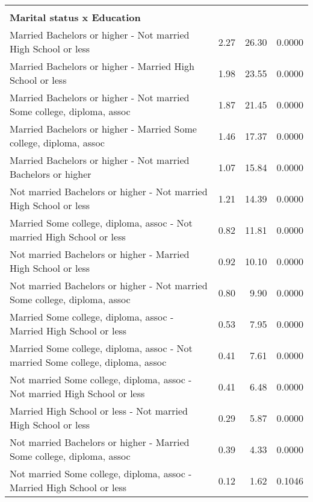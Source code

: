 \begin{center}
\begin{longtable}{lrrr}
{\bf{  }} & & & \\
{\bf{Marital status x Education}} & & & \\
\hline
    Married Bachelors or higher -  Not married High School or less & 2.27 & 26.30 & 0.0000 \\ 
    Married Bachelors or higher -  Married High School or less & 1.98 & 23.55 & 0.0000 \\ 
    Married Bachelors or higher -  Not married Some college, diploma, assoc & 1.87 & 21.45 & 0.0000 \\ 
    Married Bachelors or higher -  Married Some college, diploma, assoc & 1.46 & 17.37 & 0.0000 \\ 
    Married Bachelors or higher -  Not married Bachelors or higher & 1.07 & 15.84 & 0.0000 \\ 
    Not married Bachelors or higher -  Not married High School or less & 1.21 & 14.39 & 0.0000 \\ 
    Married Some college, diploma, assoc -  Not married High School or less & 0.82 & 11.81 & 0.0000 \\ 
    Not married Bachelors or higher -  Married High School or less & 0.92 & 10.10 & 0.0000 \\ 
    Not married Bachelors or higher -  Not married Some college, diploma, assoc & 0.80 & 9.90 & 0.0000 \\ 
    Married Some college, diploma, assoc -  Married High School or less & 0.53 & 7.95 & 0.0000 \\ 
    Married Some college, diploma, assoc -  Not married Some college, diploma, assoc & 0.41 & 7.61 & 0.0000 \\ 
    Not married Some college, diploma, assoc -  Not married High School or less & 0.41 & 6.48 & 0.0000 \\ 
    Married High School or less -  Not married High School or less & 0.29 & 5.87 & 0.0000 \\ 
    Not married Bachelors or higher -  Married Some college, diploma, assoc & 0.39 & 4.33 & 0.0000 \\ 
    Not married Some college, diploma, assoc -  Married High School or less & 0.12 & 1.62 & 0.1046 \\ 


\end{longtable}
\end{center}
